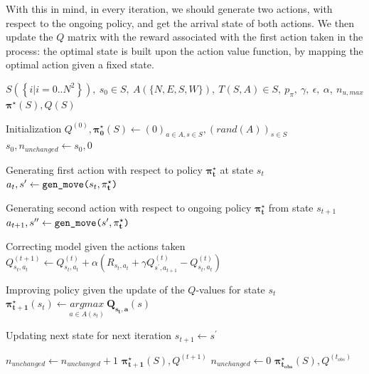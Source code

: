 \documentclass{cfg}
\begin{document}
With this in mind, in every iteration, we should generate two actions, with respect to the ongoing policy, and get the arrival state of both actions.
We then update the $Q$ matrix with the reward associated with the first action taken in the process: the optimal state is built upon the action value function, by mapping the optimal action given a fixed state.
\begin{algorithmic} 
    \REQUIRE $S(\left\{i|i=0..N^2\right\}),~s_0\in S, ~ A(\{N, E, S, W\}),~ T(S, A) \in S,~ p_{\pi},~ \gamma,~ \epsilon,~ \alpha,~ n_{u, max}$
    \ENSURE $\mathbf{\pi^\star}(S), Q(S)$
    \STATE


    \STATE\COMMENT Initialization
    \STATE $Q^{(0)}, \mathbf{\pi^{\star}_0}(S) \gets (0)_{a\in A, s\in S}, (rand(A))_{s \in S}$
    \STATE $s_0, n_{unchanged} \gets s_0, 0$
    \STATE

        \STATE\COMMENT Generating first action with respect to policy $\mathbf{\pi^{\star}_{t}}$ at state $s_t$
        \STATE $a_t, s^\prime \gets \mbox{\texttt{gen\_move(}} s_{t}, \mathbf{\pi^{\star}_{t}} \mbox{\texttt{)}}$

        \STATE\COMMENT Generating second action with respect to ongoing policy $\mathbf{\pi^{\star}_t}$ from state $s_{t+1}$
        \STATE $a_{t+1}, s^{\prime\prime} \gets \mbox{\texttt{gen\_move(}}s^\prime, \mathbf{\pi^{\star}_t}\mbox{\texttt{)}}$
        \STATE

        \STATE\COMMENT Correcting model given the actions taken
        \STATE $
            Q^{(t+1)}_{s_t, a_t} 
            \gets 
            Q^{(t)}_{s_t, a_t} 
            + \alpha (
                R_{s_t, a_t} + \gamma Q^{(t)}_{s^\prime, a_{t+1}} - Q^{(t)}_{s_t, a_t}
            )
        $

        \STATE\COMMENT Improving policy given the update of the $Q$-values for state $s_t$
        \STATE $
            \mathbf{\pi^{\star}_{t+1}}(s_t) 
            \gets
            \underset{a \in A(s_t)}{argmax}~
            \mathbf{Q_{s_t, a}}(s)
        $
        \STATE

        \STATE\COMMENT Updating next state for next iteration
        \STATE $s_{t+1} \gets s^\prime$
        \STATE

            \STATE $n_{unchanged} \gets n_{unchanged} + 1$
                \RETURN $\mathbf{\pi^\star_{t+1}}(S), Q^{(t+1)}$
            \ENDIF
        \ELSE
            \STATE $n_{unchanged} \gets 0$
        \ENDIF
    \ENDFOR
    \RETURN $\mathbf{\pi^\star_{t_{obs}}}(S), Q^{(t_{obs})}$
\end{algorithmic}
\ 
\end{document}
